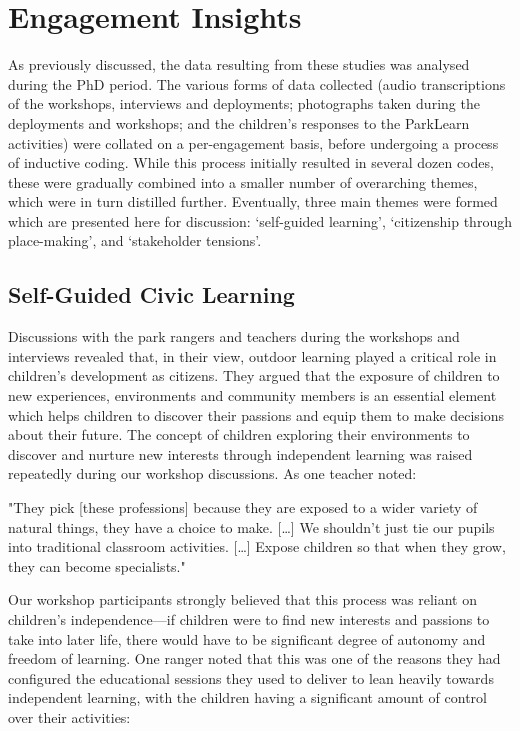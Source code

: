 \section{Engagement Insights}
\label{sec:InfrastructureInsights}
As previously discussed, the data resulting from these studies was analysed during the PhD period. The various forms of data collected (audio transcriptions of the workshops, interviews and deployments; photographs taken during the deployments and workshops; and the children's responses to the ParkLearn activities) were collated on a per-engagement basis, before undergoing a process of inductive coding. While this process initially resulted in several dozen codes, these were gradually combined into a smaller number of overarching themes, which were in turn distilled further. Eventually, three main themes were formed which are presented here for discussion: `self-guided learning', `citizenship through place-making', and `stakeholder tensions'.

\subsection{Self-Guided Civic Learning}

Discussions with the park rangers and teachers during the workshops and interviews revealed that, in their view, outdoor learning played a critical role in children’s development as citizens. They argued that the exposure of children to new experiences, environments and community members is an essential element which helps children to discover their passions and equip them to make decisions about their future. The concept of children exploring their environments to discover and nurture new interests through independent learning was raised repeatedly during our workshop discussions. As one teacher noted:

\begin{displayquote}
"They pick [these professions] because they are exposed to a wider variety of natural things, they have a choice to make. […] We shouldn’t just tie our pupils into traditional classroom activities. […] Expose children so that when they grow, they can become specialists."
\end{displayquote}

Our workshop participants strongly believed that this process was reliant on children’s independence---if children were to find new interests and passions to take into later life, there would have to be significant degree of autonomy and freedom of learning. One ranger noted that this was one of the reasons they had configured the educational sessions they used to deliver to lean heavily towards independent learning, with the children having a significant amount of control over their activities:

